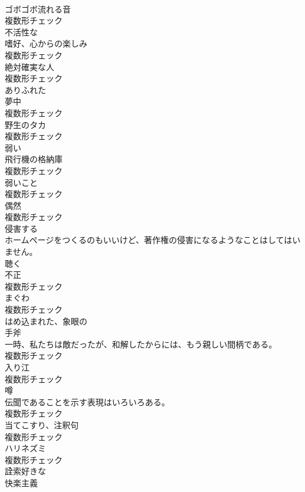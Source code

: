 \documentclass[8pt]{extreport}
\begin{document}
\begin{CJK}{UTF8}{min}
\\	[名詞]	ゴボゴボ流れる音	
\\	複数形チェック
\\	[形容詞]	不活性な	
\\	[名詞]	嗜好、心からの楽しみ	
\\	複数形チェック
\\	[名詞]	絶対確実な人	
\\	複数形チェック
\\	[形容詞]	ありふれた	
\\	[名詞]	夢中	
\\	複数形チェック
\\	[名詞]	野生のタカ	
\\	複数形チェック
\\	[形容詞]	弱い	
\\	[名詞]	飛行機の格納庫	
\\	複数形チェック
\\	[名詞]	弱いこと	
\\	複数形チェック
\\	[名詞]	偶然	
\\	複数形チェック
\\	[動詞]	侵害する	
\\	ホームページをつくるのもいいけど、著作権の侵害になるようなことはしてはいません。	
\\	[動詞]	聴く	
\\	[名詞]	不正	
\\	複数形チェック
\\	[名詞]	まぐわ	
\\	複数形チェック
\\	[形容詞]	はめ込まれた、象眼の	
\\	[名詞]	手斧	
\\	一時、私たちは敵だったが、和解したからには、もう親しい間柄である。	
\\	複数形チェック
\\	[名詞]	入り江	
\\	複数形チェック
\\	[名詞]	噂	
\\	伝聞であることを示す表現はいろいろある。	
\\	複数形チェック
\\	[名詞]	当てこすり、注釈句	
\\	複数形チェック
\\	[名詞]	ハリネズミ	
\\	複数形チェック
\\	[形容詞]	詮索好きな	
\\	[名詞]	快楽主義	

\end{CJK}
\end{document}
